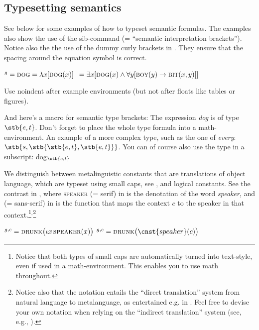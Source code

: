 \subsection{Typesetting semantics}\label{sim:sec:sem}

See below for some examples of how to typeset semantic formulas. The examples also show the use of the sib-command (= ``semantic interpretation brackets''). Notice also the the use of the dummy curly brackets in . They ensure that the spacing around the equation symbol is correct. 

\ea \ea {}$^g=\textsc{dog}=\lambda x[\textsc{dog}(x)]$\label{sim:ex:dog}
\ex {}${}=\exists x[\textsc{dog}(x)\wedge\forall y[\textsc{boy}(y)\rightarrow \textsc{bit}(x,y)]]$\label{sim:ex:quant}
\z\z

\noindent Use noindent after example environments (but not after floats like tables or figures).

And here's a macro for semantic type brackets: The expression \textit{dog} is of type $\stb{e,t}$. Don't forget to place the whole type formula into a math-environment. An example of a more complex type, such as the one of \textit{every}: $\stb{s,\stb{\stb{e,t},\stb{e,t}}}$. You can of course also use the type in a subscript: dog$_{\stb{e,t}}$

We distinguish between metalinguistic constants that are translations of object language, which are typeset using small caps, see , and logical constants. See the contrast in , where \textsc{speaker} (= serif) in  is the denotation of the word \textit{speaker}, and  (= sans-serif) in  is the function that maps the context $c$ to the speaker in that context.\footnote{Notice that both types of small caps are automatically turned into text-style, even if used in a math-environment. This enables you to use math throughout.}$^,$\footnote{Notice also that the notation entails the ``direct translation'' system from natural language to metalanguage, as entertained e.g. in \citet{Heim.Kratzer1998}. Feel free to devise your own notation when relying on the ``indirect translation'' system (see, e.g., \citealt{Coppock.Champollion2022}).}

\ea\label{sim:ex:speaker}
\ea {}$^{g,c}=\textsc{drunk}\big(\iota x\,\textsc{speaker}(x)\big)$\label{sim:ex:speaker-a}
\ex {}$^{g,c}=\textsc{drunk}\big(\cnst{speaker}(c)\big)$\label{sim:ex:speaker-b}
\z\z

